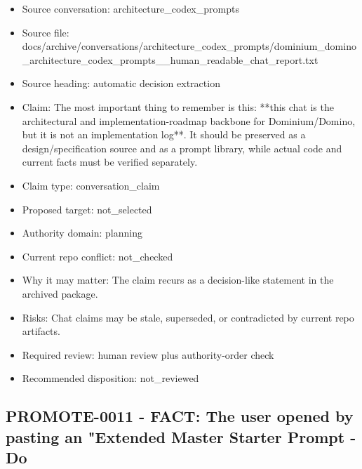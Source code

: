 \documentclass[11pt,a4paper]{report}
\begin{document}
\begin{itemize}
\item Source conversation: architecture\_codex\_prompts
\item Source file: docs/archive/conversations/architecture\_codex\_prompts/dominium\_domino\_architecture\_codex\_prompts\_\_human\_readable\_chat\_report.txt
\item Source heading: automatic decision extraction
\item Claim: The most important thing to remember is this: **this chat is the architectural and implementation-roadmap backbone for Dominium/Domino, but it is not an implementation log**. It should be preserved as a design/specification source and as a prompt library, while actual code and current facts must be verified separately.
\item Claim type: conversation\_claim
\item Proposed target: not\_selected
\item Authority domain: planning
\item Current repo conflict: not\_checked
\item Why it may matter: The claim recurs as a decision-like statement in the archived package.
\item Risks: Chat claims may be stale, superseded, or contradicted by current repo artifacts.
\item Required review: human review plus authority-order check
\item Recommended disposition: not\_reviewed
\end{itemize}

\subsection{PROMOTE-0011 - FACT: The user opened by pasting an "Extended Master Starter Prompt - Do}
\end{document}
